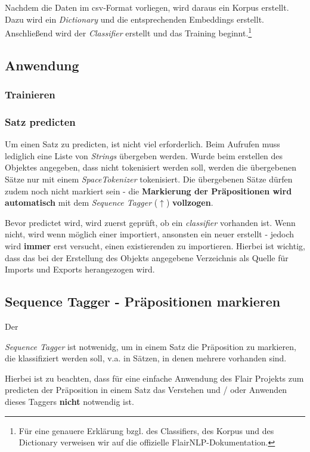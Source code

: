 \documentclass[10pt,a4paper]{article}
\begin{document}
Nachdem die Daten im csv-Format vorliegen, wird daraus ein Korpus erstellt. Dazu wird ein \textit{Dictionary} und die entsprechenden Embeddings erstellt. Anschließend wird der \textit{Classifier} erstellt und das Training beginnt.\footnote{Für eine genauere Erklärung bzgl. des Classifiers, des Korpus und des Dictionary verweisen wir auf die offizielle FlairNLP-Dokumentation.}

\subsection{Anwendung}


\subsubsection{Trainieren}


\subsubsection{Satz predicten}
Um einen Satz zu predicten, ist nicht viel erforderlich. Beim Aufrufen muss lediglich eine Liste von \textit{Strings} übergeben werden. Wurde beim erstellen des Objektes angegeben, dass nicht tokenisiert werden soll, werden die übergebenen Sätze nur mit einem \textit{SpaceTokenizer} tokenisiert. Die übergebenen Sätze dürfen zudem noch nicht markiert sein - die \textbf{Markierung der Präpositionen wird automatisch} mit dem \textit{Sequence Tagger} (\hyperlink{SeqTag}{$\uparrow$}) \textbf{vollzogen}.

Bevor predictet wird, wird zuerst geprüft, ob ein \textit{classifier} vorhanden ist. Wenn nicht, wird wenn möglich einer importiert, ansonsten ein neuer erstellt - jedoch wird \textbf{immer} erst versucht, einen existierenden zu importieren. Hierbei ist wichtig, dass das bei der Erstellung des Objekts angegebene Verzeichnis als Quelle für Imports und Exports herangezogen wird. 

\subsection{Sequence Tagger - Präpositionen markieren}
\hypertarget{SeqTag}{Der} \textit{Sequence Tagger} ist notwenidg, um in einem Satz die Präposition zu markieren, die klassifiziert werden soll, v.a. in Sätzen, in denen mehrere vorhanden sind.

Hierbei ist zu beachten, dass für eine einfache Anwendung des Flair Projekts zum predicten der Präposition in einem Satz das Verstehen und / oder Anwenden dieses Taggers \textbf{nicht} notwendig ist.
\end{document}
